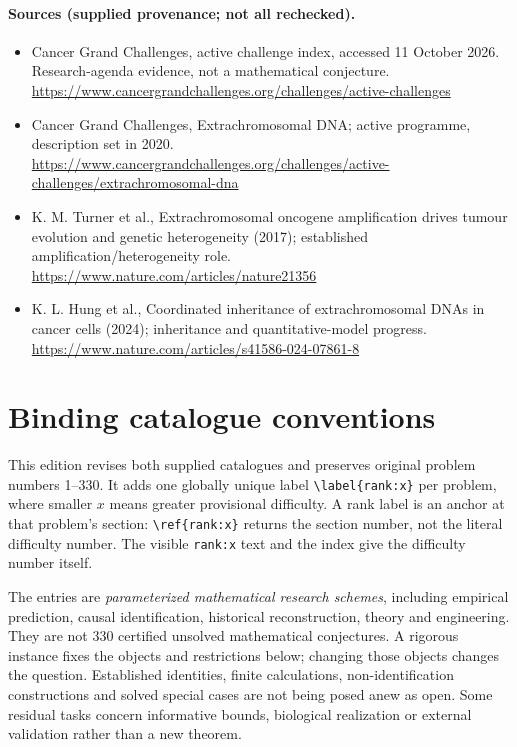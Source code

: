 \documentclass[11pt]{article}
\begin{document}
\paragraph{Sources (supplied provenance; not all rechecked).}
\begin{itemize}
\item Cancer Grand Challenges, active challenge index, accessed 11 October 2026. Research-agenda evidence, not a mathematical conjecture. \url{https://www.cancergrandchallenges.org/challenges/active-challenges}
\item Cancer Grand Challenges, Extrachromosomal DNA; active programme, description set in 2020. \url{https://www.cancergrandchallenges.org/challenges/active-challenges/extrachromosomal-dna}
\item K. M. Turner et al., Extrachromosomal oncogene amplification drives tumour evolution and genetic heterogeneity (2017); established amplification/heterogeneity role. \url{https://www.nature.com/articles/nature21356}
\item K. L. Hung et al., Coordinated inheritance of extrachromosomal DNAs in cancer cells (2024); inheritance and quantitative-model progress. \url{https://www.nature.com/articles/s41586-024-07861-8}
\end{itemize}


\section*{Binding catalogue conventions}
This edition revises both supplied catalogues and preserves original problem numbers 1--330. It adds one globally unique label \verb|\label{rank:x}| per problem, where smaller $x$ means greater provisional difficulty. A rank label is an anchor at that problem's section: \verb|\ref{rank:x}| returns the section number, not the literal difficulty number. The visible \texttt{rank:x} text and the index give the difficulty number itself.

The entries are \emph{parameterized mathematical research schemes}, including empirical prediction, causal identification, historical reconstruction, theory and engineering. They are not 330 certified unsolved mathematical conjectures. A rigorous instance fixes the objects and restrictions below; changing those objects changes the question. Established identities, finite calculations, non-identification constructions and solved special cases are not being posed anew as open. Some residual tasks concern informative bounds, biological realization or external validation rather than a new theorem.
\end{document}

